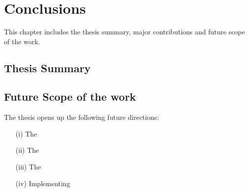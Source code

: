 \chapter{Conclusions}
This chapter includes the thesis summary, major contributions and future scope of the work.
\section{Thesis Summary}



\section{Future Scope of the work}
The thesis opens up the following future directions:
\begin{itemize}
	\item [(i)] The 
	
	\item[(ii)]  The
	
	\item[(iii)] The 
	
	\item[(iv)] Implementing


\end{itemize}	
